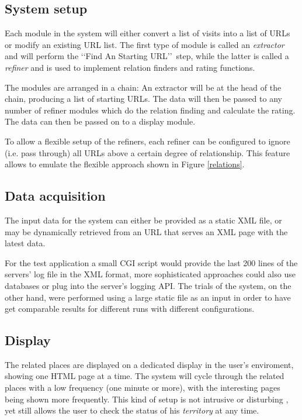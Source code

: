 \documentclass[a4paper]{danarticle}
\begin{document}
    \subsection*{System setup}
      Each module in the system will either convert a list of visits into a list
      of URLs or modify an existing URL list. The first type of module is called
      an \textit{extractor} and will perform the \lq\lq Find An Starting
      URL\rq\rq\ step, while the latter is called a \textit{refiner} and is used
      to implement relation finders and rating functions.
      
      The modules are arranged in a chain: An extractor will be at the head of
      the chain, producing a list of starting URLs. The data will then be passed
      to any number of refiner modules which do the relation finding and
      calculate the rating. The data can then be passed on to a display
      module.
    
      To allow a flexible setup of the refiners, each refiner can be configured
      to ignore (i.e. pass through) all URLs above a certain degree of
      relationship. This feature allows to emulate the flexible approach
      shown in Figure \ref{relations}.
    \subsection*{Data acquisition}
      The input data for the system can either be provided as a static XML file,
      or may be dynamically retrieved from an URL that serves an XML page with
      the latest data.
      
      For the test application a small CGI script would provide the last 200
      lines of the servers' log file in the XML format, more sophisticated
      approaches could also use databases or plug into the server's logging API.
      The trials of the system, on the other hand, were performed using a large
      static file as an input in order to have get comparable results for
      different runs with different configurations.
    \subsection*{Display}
      The related places are displayed on a dedicated display in the user's
      enviroment, showing one HTML page at a time. The system will cycle through
      the related places with a low frequency (one minute or more), with the
      interesting pages being shown more frequently. This kind of setup is not
      intrusive or disturbing \cite{webaware}, yet still allows the user to 
      check the status of his \textit{territory} at any time.
      
\end{document}
